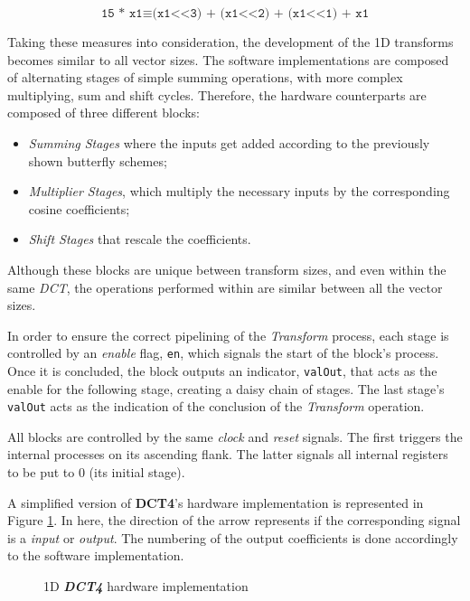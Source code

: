 \begin{equation} \label{eq:multshift}
    \texttt{15 * x1} \equiv \texttt{(x1<<3) + (x1<<2) + (x1<<1) + x1}
\end{equation}

Taking these measures into consideration, the development of the 1D transforms becomes similar to all vector sizes. The software implementations are composed of alternating stages of simple summing operations, with more complex multiplying, sum and shift cycles. Therefore, the hardware counterparts are composed of three different blocks:

\begin{itemize}
    \item \emph{Summing Stages} where the inputs get added according to the previously shown butterfly schemes;
    \item \emph{Multiplier Stages}, which multiply the necessary inputs by the corresponding cosine coefficients;
    \item \emph{Shift Stages} that rescale the coefficients.
\end{itemize} 

Although these blocks are unique between transform sizes, and even within the same \emph{DCT}, the operations performed within are similar between all the vector sizes.

In order to ensure the correct pipelining of the \emph{Transform} process, each stage is controlled by an \emph{enable} flag, \texttt{en}, which signals the start of the block's process. Once it is concluded, the block outputs an indicator, \texttt{valOut}, that acts as the enable for the following stage, creating a daisy chain of stages. The last stage's \texttt{valOut} acts as the indication of the conclusion of the \emph{Transform} operation.

All blocks are controlled by the same \emph{clock} and \emph{reset} signals. The first triggers the internal processes on its ascending flank. The latter signals all internal registers to be put to 0 (its initial stage).

A simplified version of \textbf{DCT4}'s hardware implementation is represented in Figure \ref{fig:harddct4v1}. In here, the direction of the arrow represents if the corresponding signal is a \emph{input} or \emph{output}. The numbering of the output coefficients is done accordingly to the software implementation.

\begin{figure}[!htbp]
    \centering
    
    \caption{1D \emph{\textbf{DCT4}} hardware implementation}
    \label{fig:harddct4v1}
\end{figure}

